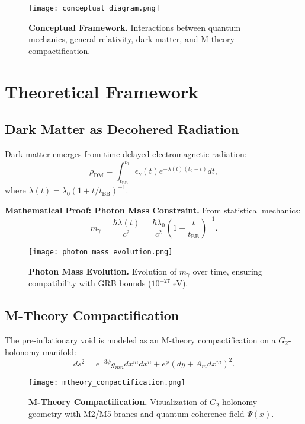 \documentclass[12pt, a4paper]{article}
\begin{document}
\begin{figure}[h]
\centering
\texttt{[image: conceptual\_diagram.png]}
\caption{\textbf{Conceptual Framework.} Interactions between quantum mechanics, general relativity, dark matter, and M-theory compactification.}
\label{fig:framework}
\end{figure}

\section*{Theoretical Framework}

\subsection*{Dark Matter as Decohered Radiation}

Dark matter emerges from time-delayed electromagnetic radiation:
\[
\rho_{\text{DM}} = \int_{t_{\text{BB}}}^{t_0} \epsilon_{\gamma}(t) e^{-\lambda(t)(t_0 - t)} dt,
\]
where \(\lambda(t) = \lambda_0 \left(1 + t/t_{\text{BB}}\right)^{-1}\).

\textbf{Mathematical Proof: Photon Mass Constraint.} From statistical mechanics:
\[
m_\gamma = \frac{\hbar \lambda(t)}{c^2} = \frac{\hbar \lambda_0}{c^2} \left(1 + \frac{t}{t_{\text{BB}}}\right)^{-1}.
\]

\begin{figure}[h]
\centering
\texttt{[image: photon\_mass\_evolution.png]}
\caption{\textbf{Photon Mass Evolution.} Evolution of \(m_\gamma\) over time, ensuring compatibility with GRB bounds (\(10^{-27}\) eV).}
\label{fig:photon_mass}
\end{figure}

\subsection*{M-Theory Compactification}

The pre-inflationary void is modeled as an M-theory compactification on a \(G_2\)-holonomy manifold:
\[
ds^2 = e^{-3\phi} g_{mn} dx^m dx^n + e^{\phi} (dy + A_m dx^m)^2.
\]

\begin{figure}[h]
\centering
\texttt{[image: mtheory\_compactification.png]}
\caption{\textbf{M-Theory Compactification.} Visualization of \(G_2\)-holonomy geometry with M2/M5 branes and quantum coherence field \(\Psi(x)\).}
\label{fig:mtheory}
\end{figure}
\end{document}
